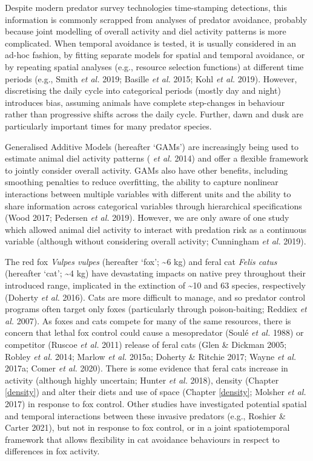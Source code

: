 \documentclass[11pt,a4paper,titlepage,twoside,openright]{style/unimelbthesis}
\begin{document}
\begin{mainmatter}
Despite modern predator survey technologies time-stamping detections, this information is commonly scrapped from analyses of predator avoidance, probably because joint modelling of overall activity and diel activity patterns is more complicated. When temporal avoidance is tested, it is usually considered in an ad-hoc fashion, by fitting separate models for spatial and temporal avoidance, or by repeating spatial analyses (e.g., resource selection functions) at different time periods (e.g., Smith \emph{et al.} 2019; Basille \emph{et al.} 2015; Kohl \emph{et al.} 2019). However, discretising the daily cycle into categorical periods (mostly day and night) introduces bias, assuming animals have complete step-changes in behaviour rather than progressive shifts across the daily cycle. Further, dawn and dusk are particularly important times for many predator species.

Generalised Additive Models (hereafter `GAMs') are increasingly being used to estimate animal diel activity patterns ( \emph{et al.} 2014) and offer a flexible framework to jointly consider overall activity. GAMs also have other benefits, including smoothing penalties to reduce overfitting, the ability to capture nonlinear interactions between multiple variables with different units and the ability to share information across categorical variables through hierarchical specifications (Wood 2017; Pedersen \emph{et al.} 2019). However, we are only aware of one study which allowed animal diel activity to interact with predation risk as a continuous variable (although without considering overall activity; Cunningham \emph{et al.} 2019).

The red fox \emph{Vulpes vulpes} (hereafter `fox'; \textasciitilde6 kg) and feral cat \emph{Felis catus} (hereafter `cat'; \textasciitilde4 kg) have devastating impacts on native prey throughout their introduced range, implicated in the extinction of \textasciitilde10 and 63 species, respectively (Doherty \emph{et al.} 2016). Cats are more difficult to manage, and so predator control programs often target only foxes (particularly through poison-baiting; Reddiex \emph{et al.} 2007). As foxes and cats compete for many of the same resources, there is concern that lethal fox control could cause a mesopredator (Soulé \emph{et al.} 1988) or competitor (Ruscoe \emph{et al.} 2011) release of feral cats (Glen \& Dickman 2005; Robley \emph{et al.} 2014; Marlow \emph{et al.} 2015a; Doherty \& Ritchie 2017; Wayne \emph{et al.} 2017a; Comer \emph{et al.} 2020). There is some evidence that feral cats increase in activity (although highly uncertain; Hunter \emph{et al.} 2018), density (Chapter \ref{density}) and alter their diets and use of space (Chapter \ref{density}; Molsher \emph{et al.} 2017) in response to fox control. Other studies have investigated potential spatial and temporal interactions between these invasive predators (e.g., Roshier \& Carter 2021), but not in response to fox control, or in a joint spatiotemporal framework that allows flexibility in cat avoidance behaviours in respect to differences in fox activity.


\end{mainmatter}
\end{document}

